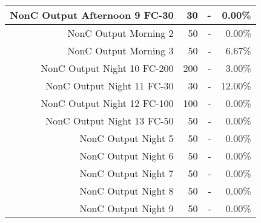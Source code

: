\begin{longtable}{|r|r|r|r|}
    NonC Output Afternoon 9 FC-30 & 30    & -     & 0.00\% \bigstrut\\
    \hline
    NonC Output Morning 2 & 50    & -     & 0.00\% \bigstrut\\
    \hline
    NonC Output Morning 3 & 50    & -     & 6.67\% \bigstrut\\
    \hline
    NonC Output Night 10 FC-200 & 200   & -     & 3.00\% \bigstrut\\
    \hline
    NonC Output Night 11 FC-30 & 30    & -     & 12.00\% \bigstrut\\
    \hline
    NonC Output Night 12 FC-100 & 100   & -     & 0.00\% \bigstrut\\
    \hline
    NonC Output Night 13 FC-50 & 50    & -     & 0.00\% \bigstrut\\
    \hline
    NonC Output Night 5 & 50    & -     & 0.00\% \bigstrut\\
    \hline
    NonC Output Night 6 & 50    & -     & 0.00\% \bigstrut\\
    \hline
    NonC Output Night 7 & 50    & -     & 0.00\% \bigstrut\\
    \hline
    NonC Output Night 8 & 50    & -     & 0.00\% \bigstrut\\
    \hline
    NonC Output Night 9 & 50    & -     & 0.00\% \bigstrut\\
    \hline
    \end{longtable}


